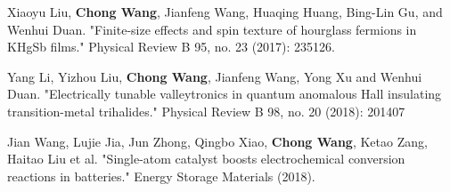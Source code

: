\begin{resume}
\begin{publications}
    \item Xiaoyu Liu, \textbf{Chong Wang}, Jianfeng Wang, Huaqing Huang, Bing-Lin Gu, and Wenhui Duan. "Finite-size effects and spin texture of hourglass fermions in KHgSb films." Physical Review B 95, no. 23 (2017): 235126.
    
    \item Yang Li, Yizhou Liu, \textbf{Chong Wang}, Jianfeng Wang, Yong Xu and Wenhui Duan. "Electrically tunable valleytronics in quantum anomalous Hall insulating transition-metal trihalides." Physical Review B 98, no. 20 (2018): 201407
    
    \item Jian Wang, Lujie Jia, Jun Zhong, Qingbo Xiao, \textbf{Chong Wang}, Ketao Zang, Haitao Liu et al. "Single-atom catalyst boosts electrochemical conversion reactions in batteries." Energy Storage Materials (2018).
  \end{publications}
\end{resume}
